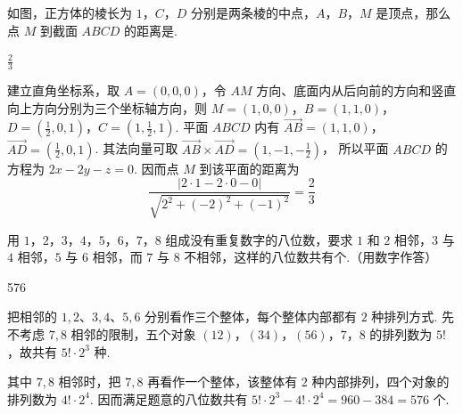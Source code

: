 \begin{problem}
如图，正方体的棱长为 \(1\)，\(C\)，\(D\) 分别是两条棱的中点，\(A\)，\(B\)，\(M\) 是顶点，那么点 \(M\) 到截面 \(ABCD\) 的距离是\fillinblank{}.


\begin{answer}
\(\frac{2}{3}\)
\end{answer}

\begin{solution}
建立直角坐标系，取 \(A=(0,0,0)\)，令 \(AM\) 方向、底面内从后向前的方向和竖直向上方向分别为三个坐标轴方向，则 \(M=(1,0,0)\)，\(B=(1,1,0)\)，\(D=\left(\frac12,0,1\right)\)，\(C=\left(1,\frac12,1\right)\).
平面 \(ABCD\) 内有
\(\overrightarrow{AB}=(1,1,0)\)，\(\overrightarrow{AD}=\left(\frac12,0,1\right)\).
其法向量可取
\(\overrightarrow{AB}\times\overrightarrow{AD}=\left(1,-1,-\frac12\right)\)，
所以平面 \(ABCD\) 的方程为 \(2x-2y-z=0\). 因而点 \(M\) 到该平面的距离为
\[
\frac{|2\cdot1-2\cdot0-0|}{\sqrt{2^2+(-2)^2+(-1)^2}}
=\frac23
\]
\end{solution}
\end{problem}

\begin{problem}
用 \(1\)，\(2\)，\(3\)，\(4\)，\(5\)，\(6\)，\(7\)，\(8\) 组成没有重复数字的八位数，要求 \(1\) 和 \(2\) 相邻，\(3\) 与 \(4\) 相邻，\(5\) 与 \(6\) 相邻，而 \(7\) 与 \(8\) 不相邻，这样的八位数共有\fillinblank{}个.（用数字作答）

\begin{answer}
576
\end{answer}

\begin{solution}
把相邻的 \(1,2\)、\(3,4\)、\(5,6\) 分别看作三个整体，每个整体内部都有 \(2\) 种排列方式. 先不考虑 \(7,8\) 相邻的限制，五个对象 \((12)\)，\((34)\)，\((56)\)，\(7\)，\(8\)
的排列数为 \(5!\)，故共有 \(5!\cdot2^3\) 种.

其中 \(7,8\) 相邻时，把 \(7,8\) 再看作一个整体，该整体有 \(2\) 种内部排列，四个对象的排列数为 \(4!\cdot2^4\). 因而满足题意的八位数共有
\(5!\cdot2^3-4!\cdot2^4=960-384=576\) 个.
\end{solution}
\end{problem}

